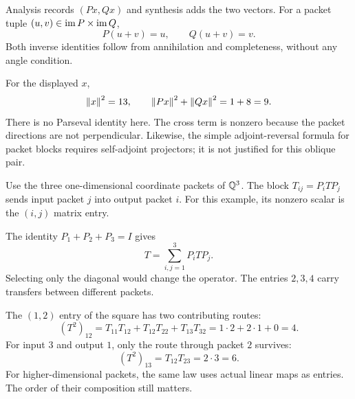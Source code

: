 
Analysis records $(Px,Qx)$ and synthesis adds the two vectors. For a packet tuple $(u,v)\in\operatorname{im} P\times\operatorname{im} Q$,
\[
P(u+v)=u,\qquad Q(u+v)=v.
\]
Both inverse identities follow from annihilation and completeness, without any angle condition.

For the displayed $x$,
\[
\left\lVert x\right\rVert^2=13,\qquad \left\lVert Px\right\rVert^2+\left\lVert Qx\right\rVert^2=1+8=9.
\]
There is no Parseval identity here. The cross term is nonzero because the packet directions are not perpendicular. Likewise, the simple adjoint-reversal formula for packet blocks requires self-adjoint projectors; it is not justified for this oblique pair.


Use the three one-dimensional coordinate packets of $\mathbb Q^3$. The block $T_{ij}=P_iTP_j$ sends input packet $j$ into output packet $i$. For this example, its nonzero scalar is the $(i,j)$ matrix entry.


The identity $P_1+P_2+P_3=I$ gives
\[
T=\sum_{i,j=1}^3 P_iTP_j.
\]
Selecting only the diagonal would change the operator. The entries $2,3,4$ carry transfers between different packets.

The $(1,2)$ entry of the square has two contributing routes:
\[
(T^2)_{12}=T_{11}T_{12}+T_{12}T_{22}+T_{13}T_{32}
=1\cdot2+2\cdot1+0=4.
\]
For input $3$ and output $1$, only the route through packet $2$ survives:
\[
(T^2)_{13}=T_{12}T_{23}=2\cdot3=6.
\]
For higher-dimensional packets, the same law uses actual linear maps as entries. The order of their composition still matters.


